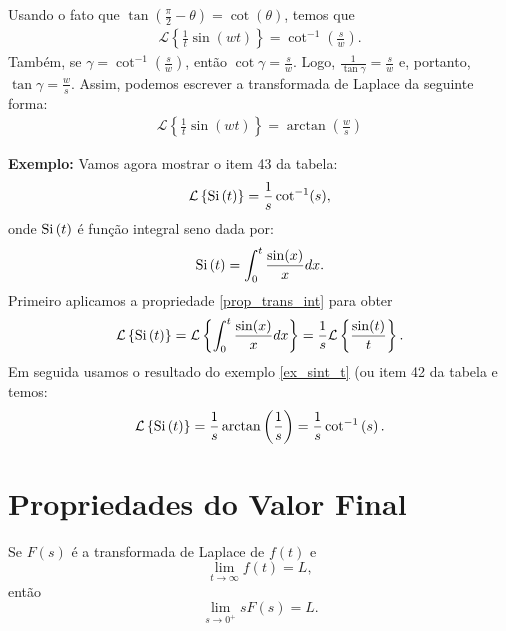 \documentclass[a4paper,10pt]{book}
\begin{document}
 Usando o fato que $\tan\left(\frac{\pi}{2}-\theta\right)=\cot(\theta)$, temos que
 \begin{eqnarray*}
 \mathcal{L}\left\{\frac{1}{t}\sin(wt)\right\}=\cot^{-1}\left(\frac{s}{w}\right).
 \end{eqnarray*}
  Também, se $\gamma=\cot^{-1}\left(\frac{s}{w}\right)$, então $\cot\gamma=\frac{s}{w}$. Logo, $\frac{1}{\tan\gamma}=\frac{s}{w}$ e, portanto, $\tan\gamma=\frac{w}{s}$. Assim, podemos escrever a transformada de Laplace da seguinte forma:
  \begin{eqnarray*}
  \mathcal{L}\left\{\frac{1}{t}\sin(wt)\right\}=\arctan\left(\frac{w}{s}\right)
  \end{eqnarray*}

{\bf Exemplo:} Vamos agora mostrar o item 43 da tabela:
 \begin{equation}
 \mathcal{L}\left\{\hbox{Si}\ \!(t)\right\}=\frac{1}{s}\cot^{-1}(s),
 \end{equation}
 onde $\hbox{Si}\ \!(t)$ é função integral seno dada por:
 \begin{equation}
 \hbox{Si}\ \!(t)=\int_0^t\frac{\sin(x)}{x}dx.
 \end{equation}
Primeiro aplicamos a propriedade \ref{prop_trans_int} para obter
 \begin{equation}
 \mathcal{L}\left\{\hbox{Si}\ \!(t)\right\}=\mathcal{L}\left\{\int_0^t\frac{\sin(x)}{x}dx\right\}=\frac{1}{s}\mathcal{L}\left\{\frac{\sin(t)}{t}\right\}.
 \end{equation}
 Em seguida usamos o resultado do exemplo \ref{ex_sint_t} (ou item 42 da tabela e temos:
 \begin{equation}
 \mathcal{L}\left\{\hbox{Si}\ \!(t)\right\}=\frac{1}{s}\arctan\left(\frac{1}{s}\right)=\frac{1}{s}\cot^{-1}\left(s\right).
 \end{equation}

% 
 \section{Propriedades do Valor Final}
Se $F(s)$ é a transformada de Laplace de $f(t)$ e 
 \begin{equation}
 \lim_{t\to\infty}f(t)=L,
 \end{equation}
 então
 \begin{equation}
 \lim_{s\to 0^+} sF(s)=L.
 \end{equation}
\end{document}
